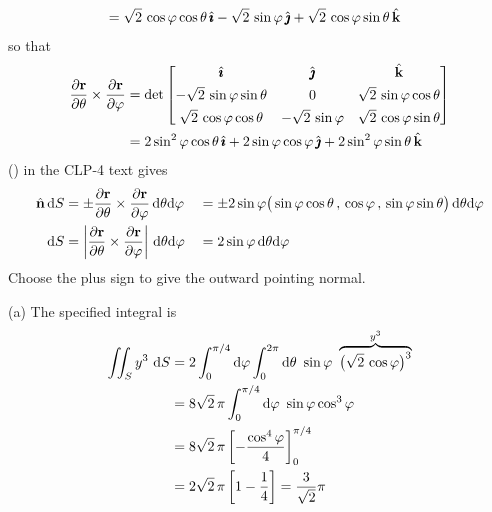 \begin{solution}
\begin{align*}
&= \sqrt{2}\,\cos\varphi\cos\theta\,\hat{\pmb{\imath}} - \sqrt{2}\,\sin\varphi\,\hat{\pmb{\jmath}} 
  + \sqrt{2}\,\cos\varphi\sin\theta\,\hat{\mathbf{k}}
\end{align*}
so that
\begin{align*}
\frac{\partial\mathbf{r}}{\partial\theta}\times\frac{\partial\mathbf{r}}{\partial\varphi}
&= \det\left[\begin{matrix} \hat{\pmb{\imath}} & \hat{\pmb{\jmath}} & \hat{\mathbf{k}} \\[0.05in]
-\sqrt{2}\,\sin\varphi\sin\theta & 0  & 
                 \sqrt{2}\,\sin\varphi\cos\theta \\[0.05in]
\sqrt{2}\,\cos\varphi\cos\theta &- \sqrt{2}\,\sin\varphi & 
                \sqrt{2}\,\cos\varphi\sin\theta
         \end{matrix}\right] \\
&= 2\sin^2\varphi\cos\theta\,\hat{\pmb{\imath}} +2\sin\varphi\cos\varphi\,\hat{\pmb{\jmath}} 
             + 2\sin^2\varphi\sin\theta\,\hat{\mathbf{k}}
\end{align*}
() in the CLP-4 text gives
\begin{alignat*}{3}
\hat{\mathbf{n}}\,\mathrm{d}S &= \pm \frac{\partial\mathbf{r}}{\partial\theta}\times
            \frac{\partial\mathbf{r}}{\partial\varphi}\,\mathrm{d}\theta\mathrm{d}\varphi
&&= \pm 2\sin\varphi
   \big(\sin\varphi\cos\theta\,,\,\cos\varphi\,,\, \sin\varphi\sin\theta\big)
          \,\mathrm{d}\theta\mathrm{d}\varphi \\
\mathrm{d}S &= \left|\frac{\partial\mathbf{r}}{\partial\theta}\times
       \frac{\partial\mathbf{r}}{\partial\varphi}\right|\,\mathrm{d}\theta\mathrm{d}\varphi
&&= 2\sin\varphi \,\mathrm{d}\theta\mathrm{d}\varphi
\end{alignat*}
Choose the plus sign to give the outward pointing normal.

(a)
The specified integral is
\begin{align*}
\dblInt_S y^3\ \dee{S}
&=2\int_0^{\pi/4}\dee{\varphi} \int_0^{2\pi}\dee{\theta}\ 
          \sin\varphi\ \overbrace{\big(\sqrt{2}\,\cos\varphi\big)^3}^{y^3} \\
&=8\sqrt{2}\,\pi \int_0^{\pi/4}\dee{\varphi}\ \sin\varphi\cos^3\varphi \\
&=8\sqrt{2}\,\pi \left[-\frac{\cos^4\varphi}{4}\right]_0^{\pi/4}  \\
&= 2\sqrt{2}\,\pi\left[1-\frac{1}{4}\right]
=\frac{3}{\sqrt{2}}\pi
\end{align*}


\end{solution}
